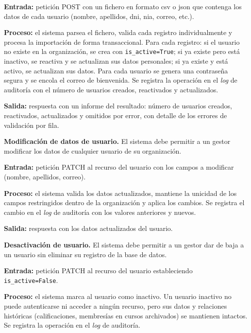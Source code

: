 \begin{functional}
    \textbf{Entrada:} petición POST con un fichero en formato \acs{csv} o \acs{json} que
    contenga los datos de cada usuario (nombre, apellidos, \acs{dni}, \acs{nia}, correo,
    etc.).

    \textbf{Proceso:} el sistema parsea el fichero, valida cada registro individualmente y
    procesa la importación de forma transaccional. Para cada registro: si el usuario no
    existe en la organización, se crea con \texttt{is\_active=True}; si ya existe pero
    está inactivo, se reactiva y se actualizan sus datos personales; si ya existe y está
    activo, se actualizan sus datos. Para cada usuario se genera una contraseña segura y se
    encola el correo de bienvenida. Se registra la operación en el \textit{log} de
    auditoría con el número de usuarios creados, reactivados y actualizados.

    \textbf{Salida:} respuesta con un informe del resultado: número de usuarios creados,
    reactivados, actualizados y omitidos por error, con detalle de los errores de
    validación por fila.

    \item \textbf{Modificación de datos de usuario.} \label{rf:users:update}
    El sistema debe permitir a un gestor modificar los datos de cualquier usuario de su
    organización.

    \textbf{Entrada:} petición PATCH al recurso del usuario con los campos a modificar
    (nombre, apellidos, correo).

    \textbf{Proceso:} el sistema valida los datos actualizados, mantiene la unicidad de los
    campos restringidos dentro de la organización y aplica los cambios. Se registra el
    cambio en el \textit{log} de auditoría con los valores anteriores y nuevos.

    \textbf{Salida:} respuesta con los datos actualizados del usuario.

    \item \textbf{Desactivación de usuario.} \label{rf:users:deactivate}
    El sistema debe permitir a un gestor dar de baja a un usuario sin eliminar su registro
    de la base de datos.

    \textbf{Entrada:} petición PATCH al recurso del usuario estableciendo
    \texttt{is\_active=False}.

    \textbf{Proceso:} el sistema marca al usuario como inactivo. Un usuario inactivo no
    puede autenticarse ni acceder a ningún recurso, pero sus datos y relaciones históricas
    (calificaciones, membresías en cursos archivados) se mantienen intactos. Se registra la
    operación en el \textit{log} de auditoría.


\end{functional}
